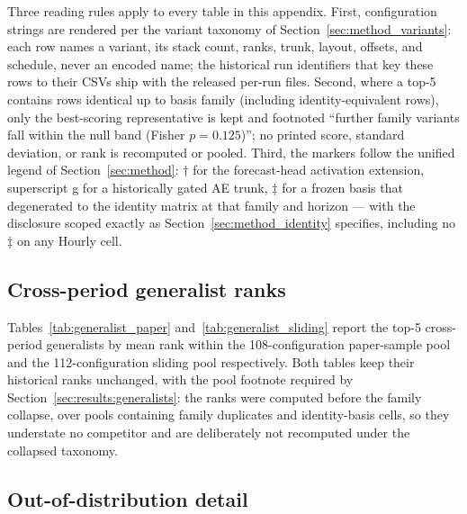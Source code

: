 Three reading rules apply to every table in this appendix. First,
configuration strings are rendered per the variant taxonomy of
Section~\ref{sec:method_variants}: each row names a variant, its stack
count, ranks, trunk, layout, offsets, and schedule, never an encoded name;
the historical run identifiers that key these rows to their CSVs ship with
the released per-run files. Second, where a top-5 contains rows identical
up to basis family (including identity-equivalent rows), only the
best-scoring representative is kept and footnoted ``further family variants
fall within the null band (Fisher $p = 0.125$)''; no printed score, standard
deviation, or rank is recomputed or pooled. Third, the markers follow the
unified legend of Section~\ref{sec:method}: $\dagger$ for the forecast-head
activation extension, superscript g for a historically gated AE trunk,
$\ddagger$ for a frozen basis that degenerated to the identity matrix at
that family and horizon --- with the disclosure scoped exactly as
Section~\ref{sec:method_identity} specifies, including no $\ddagger$ on any
Hourly cell.

\subsection{Cross-period generalist ranks}
\label{app:fulltables:generalists}

Tables~\ref{tab:generalist_paper} and~\ref{tab:generalist_sliding} report
the top-5 cross-period generalists by mean rank within the 108-configuration
paper-sample pool and the 112-configuration sliding pool respectively.
Both tables keep their historical ranks unchanged, with the pool footnote
required by Section~\ref{sec:results:generalists}: the ranks were computed
before the family collapse, over pools containing family duplicates and
identity-basis cells, so they understate no competitor and are deliberately
not recomputed under the collapsed taxonomy.

\subsection{Out-of-distribution detail}
\label{app:fulltables:ood}

